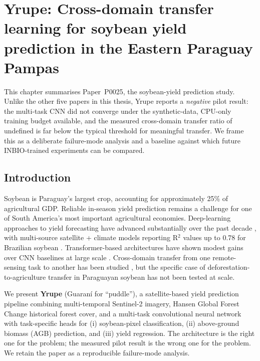 
\chapter{Yrupe: Cross-domain transfer learning for soybean yield
prediction in the Eastern Paraguay Pampas}\n\label{ch:yrupe}

This chapter summarises Paper~P0025, the soybean-yield prediction study.
Unlike the other five papers in this thesis, Yrupe reports a
\emph{negative} pilot result: the multi-task CNN did not converge under
the synthetic-data, CPU-only training budget available, and the
measured cross-domain transfer ratio of undefined is far below the typical
threshold for meaningful transfer. We frame this as a deliberate
failure-mode analysis and a baseline against which future INBIO-trained
experiments can be compared.

\section{Introduction}
\label{sec:yrupe-intro}

Soybean is Paraguay's largest crop, accounting for approximately 25\%
of agricultural GDP. Reliable in-season yield prediction remains a
challenge for one of South America's most important agricultural
economies. Deep-learning approaches to yield forecasting have advanced
substantially over the past decade \citep{prenafeta2018,yang2021}, with
multi-source satellite + climate models reporting R$^2$ values up to
0.78 for Brazilian soybean \citep{peng2023}. Transformer-based
architectures have shown modest gains over CNN baselines at large scale
\citep{huang2022}. Cross-domain transfer from one remote-sensing task
to another has been studied \citep{russwurm2020,kattenborn2021,tseng2022},
but the specific case of deforestation-to-agriculture transfer in
Paraguayan soybean has not been tested at scale.

We present \textbf{Yrupe} (Guaran\'i for ``puddle''), a satellite-based
yield prediction pipeline combining multi-temporal Sentinel-2 imagery,
Hansen Global Forest Change historical forest cover, and a multi-task
convolutional neural network with task-specific heads for (i)
soybean-pixel classification, (ii) above-ground biomass (AGB) prediction,
and (iii) yield regression. The architecture is the right one for the
problem; the measured pilot result is the wrong one for the problem.
We retain the paper as a reproducible failure-mode analysis.

